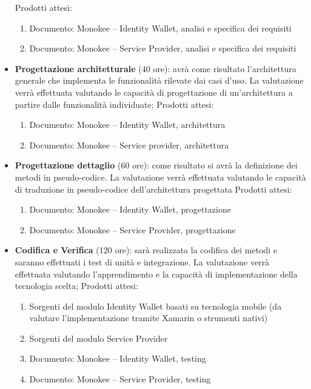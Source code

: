 \begin{itemize}
    


 
    Prodotti attesi: 
    \begin{enumerate}
        \item Documento: Monokee – Identity Wallet,  analisi e specifica dei requisiti
        \item Documento: Monokee – Service Provider,  analisi e specifica dei requisiti
    \end{enumerate}
    

\item \textbf{Progettazione architetturale} (40 ore): avrà come risultato l'architettura generale che implementa le funzionalità rilevate dai casi d'uso. La valutazione verrà effettuata valutando le capacità di progettazione di un'architettura a partire dalle funzionalità individuate;
Prodotti attesi: 
    \begin{enumerate}
        \item Documento: Monokee – Identity Wallet, architettura
        \item Documento: Monokee – Service provider, architettura
    \end{enumerate}
    

\item \textbf{Progettazione dettaglio} (60 ore): come risultato si avrà la definizione dei metodi in pseudo-codice. La valutazione verrà effettuata valutando le capacità di traduzione in pseudo-codice dell'architettura progettata
        Prodotti attesi:
        \begin{enumerate}
            \item Documento: Monokee – Identity Wallet, progettazione
            \item Documento: Monokee – Service Provider, progettazione
        \end{enumerate}
            

\item \textbf{Codifica e Verifica} (120 ore): sarà realizzata la codifica dei metodi e saranno effettuati i test di unità e integrazione. La valutazione verrà effettuata valutando l'apprendimento e la capacità di implementazione della tecnologia scelta;
Prodotti attesi: 
        \begin{enumerate}
            \item Sorgenti del modulo Identity Wallet basati su tecnologia mobile (da valutare l’implementazione tramite Xamarin o strumenti nativi)
            \item Sorgenti del modulo Service Provider
            \item Documento: Monokee – Identity Wallet, testing
            \item Documento: Monokee – Service Provider, testing
        \end{enumerate}
    


\end{itemize}

